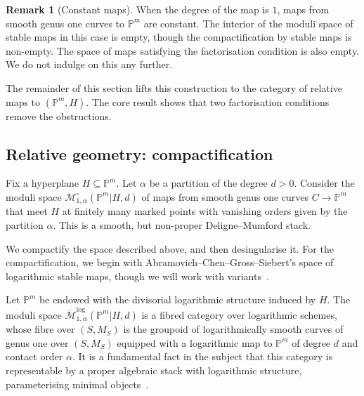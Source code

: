 \documentclass[11pt]{amsart}
\newcommand{\PP}{\mathbb P}
\renewcommand{\to}{\rightarrow}
\theoremstyle{definition}
\theoremstyle{definition}
\newtheorem{remark}[thm]{Remark}
\begin{document}
\begin{remark}[Constant maps]\label{rem: constant-maps}
When the degree of the map is $1$, maps from smooth genus one curves to $\PP^m$ are constant. The interior of the moduli space of stable maps in this case is empty, though the compactification by stable maps is non-empty. The space of maps satisfying the factorisation condition is also empty. We do not indulge on this any further. 
\end{remark}

The remainder of this section lifts this construction to the category of relative maps to $(\mathbb P^m,H)$. The core result shows that two factorisation conditions remove the obstructions. 

\subsection{Relative geometry: compactification} Fix a hyperplane $H\subseteq \mathbb P^m$. Let $\alpha$ be a partition of the degree $d>0$. Consider the moduli space $\mathcal M_{1,\alpha}^\circ(\mathbb P^m|H,d)$ of maps from smooth genus one curves $C\to \mathbb P^m$ that meet $H$ at finitely many marked points with vanishing orders given by the partition $\alpha$. This is a smooth, but non-proper Deligne--Mumford stack. 

We compactify the space described above, and then desingularise it. For the compactification, we begin with Abramovich--Chen--Gross--Siebert's space of logarithmic stable maps, though we will work with variants~\cite{AbramovichChenLog,ChenLog,GrossSiebertLog,KimLog}.

Let $\PP^m$ be endowed with the divisorial logarithmic structure induced by $H$. The moduli space $\overline{\mathcal{M}}^{\operatorname{log}}_{1,\alpha}(\mathbb P^m|H,d)$ is a fibred category over logarithmic schemes, whose fibre over $(S,M_S)$ is the groupoid of logarithmically smooth curves of genus one over $(S,M_S)$ equipped with a logarithmic map to $\mathbb P^m$ of degree $d$ and contact order $\alpha$. It is a fundamental fact in the subject that this category is representable by a proper algebraic stack with logarithmic structure, parameterising minimal objects~\cite{ChenLog}. 

\begin{comment}
There is a representable finite logarithmic morphism to the Kontsevich space, forgetting the logarithmic structure on the target:
$$
\overline{\mathcal M}^{\mathrm{log}}_{1,\alpha}(\mathbb P^m|H,d) \to \overline{\mathcal M}_{1,n}(\mathbb P^m,d).
$$
\end{comment}
\end{document}
